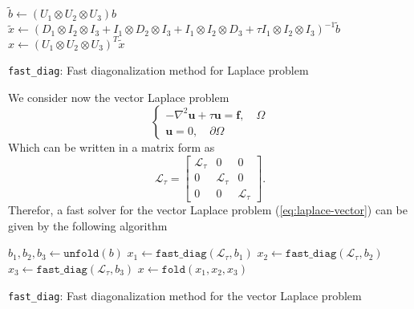 \begin{algorithm}[ht]
\DontPrintSemicolon
\SetAlgoLined
{}
\BlankLine
$\tilde{b} \gets \left( U_1 \otimes U_2 \otimes U_3 \right) b$ \; 
$\tilde{x} \gets \left( D_1 \otimes I_2 \otimes I_3 +  I_1 \otimes D_2 \otimes I_3 + I_1 \otimes I_2 \otimes D_3 + \tau I_1 \otimes I_2 \otimes I_3 \right)^{-1} \tilde{b}$ \; 
$x \gets \left( U_1 \otimes U_2 \otimes U_3 \right)^T \tilde{x}$ \; 

\caption{\texttt{fast\_diag}: Fast diagonalization method for Laplace problem}
\end{algorithm} 
We consider now the vector Laplace problem
\begin{equation}
  \begin{cases}
  - \nabla^2 \mathbf{u} + \tau \mathbf{u} = \mathbf{f}, \quad \Omega \\
  \mathbf{u}=0, \quad \partial\Omega
  \end{cases}
  \label{eq:laplace-vector}
\end{equation}
Which can be written in a matrix form as
\begin{equation} 
  \bm{\mathcal{L}}_{\tau} =
  \begin{bmatrix}
   \mathcal{L}_{\tau} &                  0 & 0  \\
                    0 & \mathcal{L}_{\tau} & 0  \\
                    0 &                  0 & \mathcal{L}_{\tau}  
  \end{bmatrix}.
  \label{eq:laplace-vector-matrix-form}
\end{equation}
Therefor, a fast solver for the vector Laplace problem (\ref{eq:laplace-vector}) can be given by the following algorithm
\begin{algorithm}[H]
\DontPrintSemicolon
\SetAlgoLined
{}
\BlankLine

  $b_1, b_2, b_3 \gets \texttt{unfold}(b)$ \; 
  $x_1 \gets \texttt{fast\_diag}(\mathcal{L}_{\tau}, b_1)$ \; 
  $x_2 \gets \texttt{fast\_diag}(\mathcal{L}_{\tau}, b_2)$ \; 
  $x_3 \gets \texttt{fast\_diag}(\mathcal{L}_{\tau}, b_3)$ \; 
  $x \gets \texttt{fold}(x_1, x_2, x_3)$ \; 

\caption{\texttt{fast\_diag}: Fast diagonalization method for the vector Laplace problem}
\end{algorithm} 

